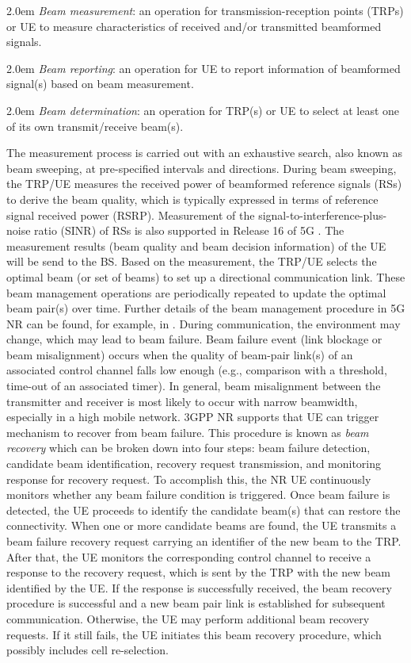 \documentclass[journal,comsoc]{IEEEtran}
\begin{document}
\hangindent 2.0em
\checkmark \emph{Beam measurement}: an operation for transmission-reception points (TRPs) or UE to measure characteristics of received and/or transmitted beamformed signals.

\hangindent 2.0em
\checkmark \emph{Beam reporting}: an operation for UE to report information of beamformed signal(s) based on beam measurement.

\hangindent 2.0em
\checkmark \emph{Beam determination}: an operation for TRP(s) or UE to select at least one of its own transmit/receive beam(s).


The measurement process is carried out with an exhaustive search, also known as beam sweeping, at pre-specified intervals and directions. During beam sweeping, the TRP/UE measures the received power of beamformed reference signals (RSs) to derive the beam quality, which is typically expressed in terms of reference signal received power (RSRP). Measurement of the signal-to-interference-plus-noise ratio (SINR) of RSs is also supported in Release 16 of 5G \cite{Six-Key-Challenges-Beam-Management-2021}. The measurement results (beam quality and beam decision information) of the UE will be send to the BS. Based on the measurement, the TRP/UE selects the optimal beam (or set of beams) to set up a directional communication link. These beam management operations are periodically repeated to update the optimal beam pair(s) over time. Further details of the beam management procedure in 5G NR can be found, for example, in \cite{Beam-Management-2020}. During communication, the environment may change, which may lead to beam failure. Beam failure event (link blockage or beam misalignment) occurs when the quality of beam-pair link(s) of an associated control channel falls low enough (e.g., comparison with a threshold, time-out of an associated timer). In general, beam misalignment between the transmitter and receiver is most likely to occur with narrow beamwidth, especially in a high mobile network. 3GPP NR supports that UE can trigger mechanism to recover from beam failure. This procedure is known as \emph{beam recovery} which can be broken down into four steps: beam failure detection, candidate beam identification, recovery request transmission, and monitoring response for recovery request. To accomplish this, the NR UE continuously monitors whether any beam failure condition is triggered. Once beam failure is detected, the UE proceeds to identify the candidate beam(s) that can restore the connectivity. When one or more candidate beams are found, the UE transmits a beam failure recovery request carrying an identifier of the new beam to the TRP. After that, the UE  monitors the corresponding control channel to receive a response to the recovery request, which is sent by the TRP with the new beam identified by the UE. If the response is successfully received, the beam recovery procedure is successful and a new beam pair link is established for subsequent communication. Otherwise, the UE may perform additional beam recovery requests. If it still fails, the UE initiates this beam recovery procedure, which possibly includes cell re-selection.
\end{document}
